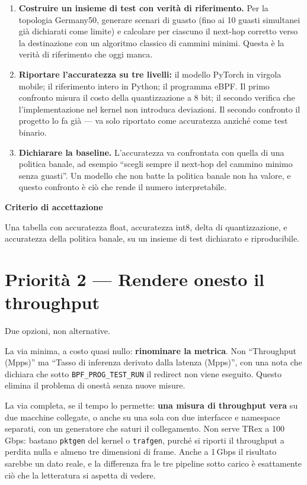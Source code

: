 \documentclass[11pt,a4paper,oneside]{report}
\newcommand{\verdetto}[2]{%
  \par\vspace{4pt}%
  \noindent\colorbox{boxbg}{%
    \begin{minipage}{\dimexpr\linewidth-2\fboxsep}%
      \vspace{3pt}\textbf{\color{accent}#1}\par\vspace{2pt}#2\vspace{3pt}%
    \end{minipage}}%
  \par\vspace{6pt}}
\begin{document}
\begin{enumerate}
  \item \textbf{Costruire un insieme di test con verità di
  riferimento.} Per la topologia Germany50, generare scenari di guasto
  (fino ai 10 guasti simultanei già dichiarati come limite) e calcolare
  per ciascuno il next-hop corretto verso la destinazione con un
  algoritmo classico di cammini minimi. Questa è la verità di
  riferimento che oggi manca.

  \item \textbf{Riportare l'accuratezza su tre livelli:} il modello
  PyTorch in virgola mobile; il riferimento intero in Python; il
  programma eBPF. Il primo confronto misura il costo della
  quantizzazione a 8 bit; il secondo verifica che l'implementazione nel
  kernel non introduca deviazioni. Il secondo confronto il progetto lo
  fa già --- va solo riportato come accuratezza anziché come test
  binario.

  \item \textbf{Dichiarare la baseline.} L'accuratezza va confrontata
  con quella di una politica banale, ad esempio ``scegli sempre il
  next-hop del cammino minimo senza guasti''. Un modello che non batte
  la politica banale non ha valore, e questo confronto è ciò che rende
  il numero interpretabile.
\end{enumerate}

\verdetto{Criterio di accettazione}{Una tabella con accuratezza float,
accuratezza int8, delta di quantizzazione, e accuratezza della
politica banale, su un insieme di test dichiarato e riproducibile.}

\section{Priorità 2 --- Rendere onesto il throughput}

Due opzioni, non alternative.

La via minima, a costo quasi nullo: \textbf{rinominare la metrica}. Non
``Throughput (Mpps)'' ma ``Tasso di inferenza derivato dalla latenza
(Mpps)'', con una nota che dichiara che sotto
\texttt{BPF\_PROG\_TEST\_RUN} il redirect non viene eseguito. Questo
elimina il problema di onestà senza nuove misure.

La via completa, se il tempo lo permette: \textbf{una misura di
throughput vera} su due macchine collegate, o anche su una sola con due
interfacce e namespace separati, con un generatore che saturi il
collegamento. Non serve TRex a 100\,Gbps: bastano \texttt{pktgen} del
kernel o \texttt{trafgen}, purché si riporti il throughput a perdita
nulla e almeno tre dimensioni di frame. Anche a 1\,Gbps il risultato
sarebbe un dato reale, e la differenza fra le tre pipeline sotto carico
è esattamente ciò che la letteratura si aspetta di vedere.
\end{document}
